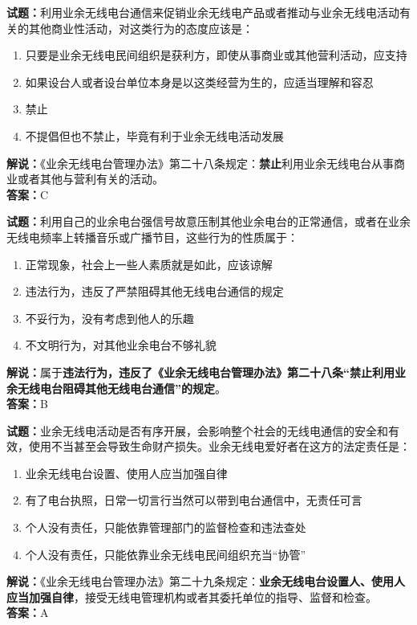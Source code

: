 \documentclass{ctexbook}
\begin{document}
\vspace{\baselineskip}

\noindent\textbf{试题：}利用业余无线电台通信来促销业余无线电产品或者推动与业余无线电活动有关的其他商业性活动，对这类行为的态度应该是：
\begin{enumerate}[leftmargin=3em]
  \item 只要是业余无线电民间组织是获利方，即使从事商业或其他营利活动，应支持
  \item 如果设台人或者设台单位本身是以这类经营为生的，应适当理解和容忍
  \item 禁止
  \item 不提倡但也不禁止，毕竟有利于业余无线电活动发展
\end{enumerate}
\noindent\textbf{解说：}《业余无线电台管理办法》第二十八条规定：\textbf{禁止}利用业余无线电台从事商业或者其他与营利有关的活动。\\\noindent\textbf{答案：}C

\vspace{\baselineskip}

\noindent\textbf{试题：}利用自己的业余电台强信号故意压制其他业余电台的正常通信，或者在业余无线电频率上转播音乐或广播节目，这些行为的性质属于：
\begin{enumerate}[leftmargin=3em]
  \item 正常现象，社会上一些人素质就是如此，应该谅解
  \item 违法行为，违反了严禁阻碍其他无线电台通信的规定
  \item 不妥行为，没有考虑到他人的乐趣
  \item 不文明行为，对其他业余电台不够礼貌
\end{enumerate}
\noindent\textbf{解说：}属于\textbf{违法行为，违反了《业余无线电台管理办法》第二十八条“禁止利用业余无线电台阻碍其他无线电台通信”的规定}。\\\noindent\textbf{答案：}B

\vspace{\baselineskip}

\noindent\textbf{试题：}业余无线电活动是否有序开展，会影响整个社会的无线电通信的安全和有效，使用不当甚至会导致生命财产损失。业余无线电爱好者在这方的法定责任是：
\begin{enumerate}[leftmargin=3em]
  \item 业余无线电台设置、使用人应当加强自律
  \item 有了电台执照，日常一切言行当然可以带到电台通信中，无责任可言
  \item 个人没有责任，只能依靠管理部门的监督检查和违法查处
  \item 个人没有责任，只能依靠业余无线电民间组织充当“协管”
\end{enumerate}
\noindent\textbf{解说：}《业余无线电台管理办法》第二十九条规定：\textbf{业余无线电台设置人、使用人应当加强自律}，接受无线电管理机构或者其委托单位的指导、监督和检查。\\\noindent\textbf{答案：}A
\end{document}
